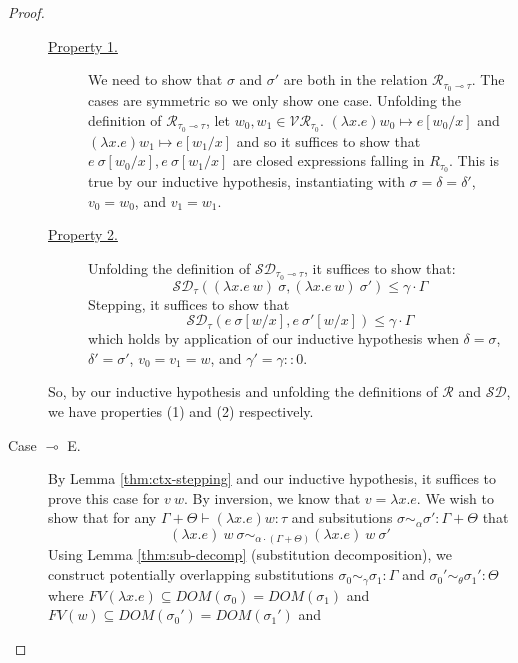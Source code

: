 \begin{proof}
\begin{description}
      \begin{description}
        \item[\underline{Property 1.}] We need to show that $\sigma$ and
          $\sigma'$ are both in the relation $\mathcal{R}_{\tau_0 \multimap
          \tau}$. The cases are symmetric so we only show one case. Unfolding
          the definition of $\mathcal{R}_{\tau_0 \multimap \tau}$, let $w_0, w_1
          \in \mathcal{VR}_{\tau_0}$. 
          $(\lambda x . e) w_0 \mapsto e[w_0/x]$
          and
          $(\lambda x . e) w_1 \mapsto e[w_1/x]$
          and so it suffices to show that
          $e~\sigma[w_0/x], e~\sigma[w_1/x]$ 
          are closed expressions falling in $R_{\tau_0}$.
          This is true by our inductive hypothesis, instantiating with $\sigma =
          \delta = \delta'$, $v_0 = w_0$, and $v_1 = w_1$.
        \item[\underline{Property 2.}] Unfolding the definition of
          $\mathcal{SD}_{\tau_0 \multimap \tau}$, it suffices to show that:
          $$
          \mathcal{SD}_{\tau}
          ((\lambda x . e~w)~\sigma, (\lambda x . e~w)~\sigma') 
          \leq \gamma \cdot \Gamma
          $$
          Stepping, it suffices to show that
          $$
          \mathcal{SD}_{\tau}
          (e~\sigma[w/x], e~\sigma'[w/x]) 
          \leq \gamma \cdot \Gamma
          $$
          which holds by application of our inductive hypothesis when $\delta =
          \sigma$, $\delta' = \sigma'$, $v_0 = v_1 = w$, and $\gamma' = \gamma
          :: 0$.
      \end{description}
      So, by our inductive hypothesis and unfolding the definitions of
      $\mathcal{R}$ and $\mathcal{SD}$, we have properties (1) and (2)
      respectively. 
    \item[Case $\multimap$ E.] 
      By Lemma \ref{thm:ctx-stepping} and our inductive hypothesis, it suffices
      to prove this case for $v~w$.
      By inversion, we know that $v = \lambda x . e$.
      We wish to show that for any $\Gamma + \Theta \vdash (\lambda x . e) w : \tau$ and
      subsitutions 
      $\sigma \sim_{\alpha} \sigma': \Gamma + \Theta$ 
      that 
      $$(\lambda x . e)~w~\sigma \sim_{\alpha \cdot (\Gamma + \Theta)} (\lambda x . e)~w~\sigma'$$
      Using Lemma \ref{thm:sub-decomp} (substitution decomposition), we
      construct potentially overlapping substitutions 
      $\sigma_0 \sim_{\gamma} \sigma_1 : \Gamma$ 
      and $\sigma_0' \sim_{\theta} \sigma_1' : \Theta$
      where $FV(\lambda x . e) \subseteq DOM(\sigma_0) = DOM(\sigma_1)$ and  
      $FV(w) \subseteq DOM(\sigma_0') = DOM(\sigma_1')$ and 

\end{description}
\end{proof}
